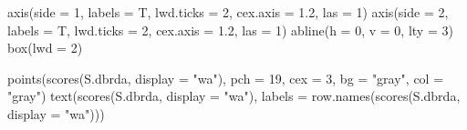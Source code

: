 \documentclass[
]{article}
\newenvironment{Shaded}{\begin{snugshade}}{\end{snugshade}}
\newcommand{\AttributeTok}[1]{\textcolor[rgb]{0.77,0.63,0.00}{#1}}
\newcommand{\DecValTok}[1]{\textcolor[rgb]{0.00,0.00,0.81}{#1}}
\newcommand{\FloatTok}[1]{\textcolor[rgb]{0.00,0.00,0.81}{#1}}
\newcommand{\FunctionTok}[1]{\textcolor[rgb]{0.00,0.00,0.00}{#1}}
\newcommand{\NormalTok}[1]{#1}
\newcommand{\StringTok}[1]{\textcolor[rgb]{0.31,0.60,0.02}{#1}}
\begin{document}
\begin{Shaded}
\begin{Highlighting}[]
\FunctionTok{axis}\NormalTok{(}\AttributeTok{side =} \DecValTok{1}\NormalTok{, }\AttributeTok{labels =}\NormalTok{ T, }\AttributeTok{lwd.ticks =} \DecValTok{2}\NormalTok{, }\AttributeTok{cex.axis =} \FloatTok{1.2}\NormalTok{, }\AttributeTok{las =} \DecValTok{1}\NormalTok{)}
\FunctionTok{axis}\NormalTok{(}\AttributeTok{side =} \DecValTok{2}\NormalTok{, }\AttributeTok{labels =}\NormalTok{ T, }\AttributeTok{lwd.ticks =} \DecValTok{2}\NormalTok{, }\AttributeTok{cex.axis =} \FloatTok{1.2}\NormalTok{, }\AttributeTok{las =} \DecValTok{1}\NormalTok{)}
\FunctionTok{abline}\NormalTok{(}\AttributeTok{h =} \DecValTok{0}\NormalTok{, }\AttributeTok{v =} \DecValTok{0}\NormalTok{, }\AttributeTok{lty =} \DecValTok{3}\NormalTok{)}
\FunctionTok{box}\NormalTok{(}\AttributeTok{lwd =} \DecValTok{2}\NormalTok{)}

\FunctionTok{points}\NormalTok{(}\FunctionTok{scores}\NormalTok{(S.dbrda, }\AttributeTok{display =} \StringTok{"wa"}\NormalTok{),}
       \AttributeTok{pch =} \DecValTok{19}\NormalTok{, }\AttributeTok{cex =} \DecValTok{3}\NormalTok{, }\AttributeTok{bg =} \StringTok{"gray"}\NormalTok{, }\AttributeTok{col =} \StringTok{"gray"}\NormalTok{)}
\FunctionTok{text}\NormalTok{(}\FunctionTok{scores}\NormalTok{(S.dbrda, }\AttributeTok{display =} \StringTok{"wa"}\NormalTok{),}
     \AttributeTok{labels =} \FunctionTok{row.names}\NormalTok{(}\FunctionTok{scores}\NormalTok{(S.dbrda, }\AttributeTok{display =} \StringTok{"wa"}\NormalTok{)))}


\end{Highlighting}
\end{Shaded}
\end{document}
